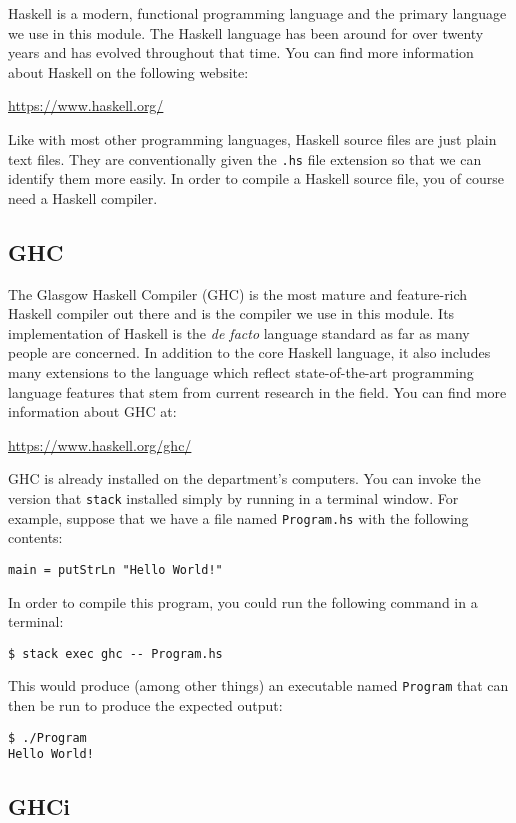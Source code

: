 Haskell is a modern, functional programming language and the primary language we use in this module. The Haskell language has been around for over twenty years and has evolved throughout that time. You can find more information about Haskell on the following website:
\begin{center}
	\url{https://www.haskell.org/}
\end{center}
Like with most other programming languages, Haskell source files are just plain text files. They are conventionally given the \texttt{\small .hs} file extension so that we can identify them more easily. In order to compile a Haskell source file, you of course need a Haskell compiler.

\subsection{GHC}

The Glasgow Haskell Compiler (GHC) is the most mature and feature-rich Haskell compiler out there and is the compiler we use in this module. Its implementation of Haskell is the \emph{de facto} language standard as far as many people are concerned. In addition to the core Haskell language, it also includes many extensions to the language which reflect state-of-the-art programming language features that stem from current research in the field. You can find more information about GHC at:
\begin{center}
	\url{https://www.haskell.org/ghc/}
\end{center}
GHC is already installed on the department's computers. You can invoke the version that \texttt{\small stack} installed simply by running  in a terminal window. For example, suppose that we have a file named \texttt{\small Program.hs} with the following contents:
\begin{verbatim}
main = putStrLn "Hello World!"
\end{verbatim}
In order to compile this program, you could run the following command in a terminal:
\begin{verbatim}
$ stack exec ghc -- Program.hs
\end{verbatim}
This would produce (among other things) an executable named \texttt{\small Program} that can then be run to produce the expected output:
\begin{verbatim}
$ ./Program 
Hello World!
\end{verbatim}

\subsection{GHCi}

